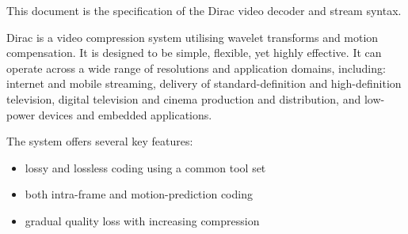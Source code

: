 
This document is the specification of the Dirac video decoder and stream syntax.

Dirac is a video compression system utilising wavelet transforms and motion
compensation. It is designed to be simple, flexible, yet highly effective. 
It can operate across a wide range of resolutions and
application domains, including: internet and mobile streaming, delivery of 
standard-definition and high-definition
television, digital television and cinema production and distribution,
and low-power devices and embedded applications.

The system offers several key features:
\begin{itemize}
    \item lossy and lossless coding using a common tool set
	\item both intra-frame and motion-prediction coding
	\item gradual quality loss with increasing compression 
\end{itemize}


